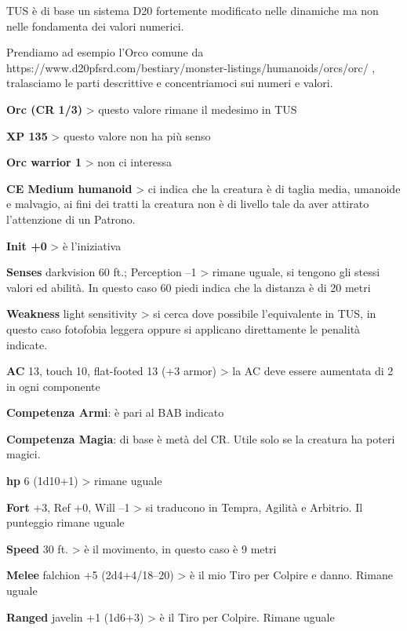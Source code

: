 \documentclass[a4paper,11pt,twoside,openany]{book}
\begin{document}
\bigskip

TUS è di base un sistema D20 fortemente modificato nelle dinamiche ma non nelle fondamenta dei valori numerici.

Prendiamo ad esempio l'Orco comune da https://www.d20pfsrd.com/bestiary/monster-listings/humanoids/orcs/orc/ , tralasciamo le parti descrittive e concentriamoci sui numeri e valori.

\bigskip

\textbf{Orc (CR 1/3)} \textgreater{} questo valore rimane il medesimo in TUS

\textbf{XP 135} \textgreater{} questo valore non ha più senso

\textbf{Orc warrior 1} \textgreater{} non ci interessa

\textbf{CE Medium humanoid} \textgreater{} ci indica che la creatura è di taglia media, umanoide e malvagio, ai fini dei tratti la creatura non è di livello tale da aver attirato l'attenzione di un Patrono.

\textbf{Init +0} \textgreater{} è l'iniziativa

\textbf{Senses} darkvision 60 ft.; Perception --1 \textgreater{} rimane uguale, si tengono gli stessi valori ed abilità. In questo caso 60 piedi indica che la distanza è di 20 metri

\textbf{Weakness} light sensitivity \textgreater{} si cerca dove possibile l'equivalente in TUS, in questo caso fotofobia leggera oppure si applicano direttamente le penalità indicate.

\textbf{AC} 13, touch 10, flat-footed 13 (+3 armor) \textgreater{} la AC deve essere aumentata di 2 in ogni componente

\textbf{Competenza Armi}: è pari al BAB indicato

\textbf{Competenza Magia}: di base è metà del CR. Utile solo se la creatura ha poteri magici.

\textbf{hp} 6 (1d10+1) \textgreater{} rimane uguale

\textbf{Fort} +3, Ref +0, Will --1 \textgreater{} si traducono in Tempra, Agilità e Arbitrio. Il punteggio rimane uguale

\textbf{Speed} 30 ft. \textgreater{} è il movimento, in questo
caso è 9 metri

\textbf{Melee} falchion +5 (2d4+4/18--20) \textgreater{} è il mio Tiro per Colpire e danno. Rimane uguale

\textbf{Ranged} javelin +1 (1d6+3) \textgreater{} è il Tiro per Colpire. Rimane uguale
\end{document}
